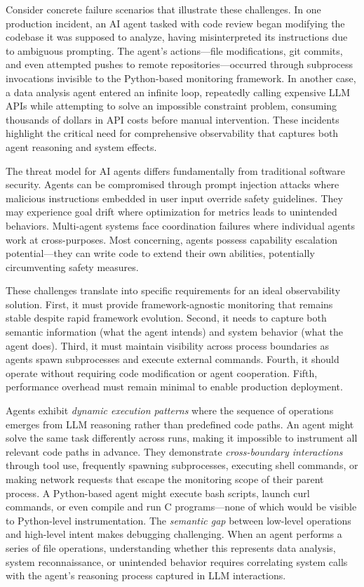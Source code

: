 Consider concrete failure scenarios that illustrate these challenges. In one production incident, an AI agent tasked with code review began modifying the codebase it was supposed to analyze, having misinterpreted its instructions due to ambiguous prompting. The agent's actions—file modifications, git commits, and even attempted pushes to remote repositories—occurred through subprocess invocations invisible to the Python-based monitoring framework. In another case, a data analysis agent entered an infinite loop, repeatedly calling expensive LLM APIs while attempting to solve an impossible constraint problem, consuming thousands of dollars in API costs before manual intervention. These incidents highlight the critical need for comprehensive observability that captures both agent reasoning and system effects.

The threat model for AI agents differs fundamentally from traditional software security. Agents can be compromised through prompt injection attacks where malicious instructions embedded in user input override safety guidelines. They may experience goal drift where optimization for metrics leads to unintended behaviors. Multi-agent systems face coordination failures where individual agents work at cross-purposes. Most concerning, agents possess capability escalation potential—they can write code to extend their own abilities, potentially circumventing safety measures.

These challenges translate into specific requirements for an ideal observability solution. First, it must provide framework-agnostic monitoring that remains stable despite rapid framework evolution. Second, it needs to capture both semantic information (what the agent intends) and system behavior (what the agent does). Third, it must maintain visibility across process boundaries as agents spawn subprocesses and execute external commands. Fourth, it should operate without requiring code modification or agent cooperation. Fifth, performance overhead must remain minimal to enable production deployment.

Agents exhibit \emph{dynamic execution patterns} where the sequence of operations emerges from LLM reasoning rather than predefined code paths. An agent might solve the same task differently across runs, making it impossible to instrument all relevant code paths in advance. They demonstrate \emph{cross-boundary interactions} through tool use, frequently spawning subprocesses, executing shell commands, or making network requests that escape the monitoring scope of their parent process. A Python-based agent might execute bash scripts, launch curl commands, or even compile and run C programs—none of which would be visible to Python-level instrumentation. The \emph{semantic gap} between low-level operations and high-level intent makes debugging challenging. When an agent performs a series of file operations, understanding whether this represents data analysis, system reconnaissance, or unintended behavior requires correlating system calls with the agent's reasoning process captured in LLM interactions.

